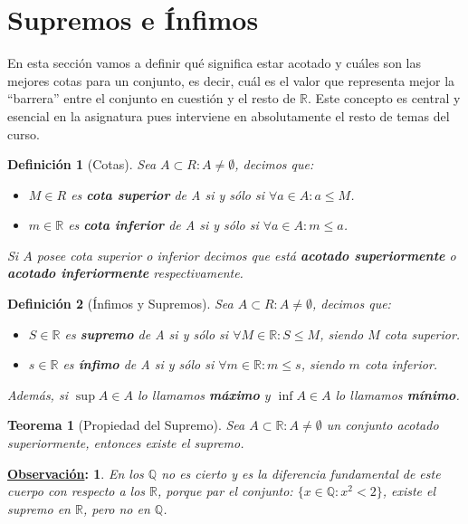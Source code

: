 \documentclass[10pt,a4paper,openright]{book}
\theoremstyle{break}
\newtheorem*{defi}{Definición}
\newtheorem*{theo}{Teorema}
\newtheorem*{obs}{\underline{Observación}:}
\begin{document}
\section{Supremos e Ínfimos}
En esta sección vamos a definir qué significa estar acotado y cuáles son las mejores cotas para un conjunto, es decir, cuál es el valor que representa mejor la ``barrera'' entre el conjunto en cuestión y el resto de $\mathbb{R}$. Este concepto es central y esencial en la asignatura pues interviene en absolutamente el resto de temas del curso.

\begin{defi}[Cotas]
Sea $A\subset R: A\neq \emptyset$, decimos que:
\begin{itemize}
\item $M\in R$ es \textbf{cota superior} de A si y sólo si $\forall a\in A: a\leq M$.

\item $m\in \mathbb R$ es \textbf{cota inferior} de A si y sólo si $\forall a\in A: m\leq a$.
\end{itemize}
Si $A$ posee cota superior o inferior decimos que está \textbf{acotado superiormente} o \textbf{acotado inferiormente} respectivamente.
\end{defi}

\begin{defi}[Ínfimos y Supremos]
Sea $A\subset R: A\neq \emptyset$, decimos que:
\begin{itemize}
\item $S\in \mathbb R$ es \textbf{supremo} de A si y sólo si $\forall M\in \mathbb R: S\leq M $, siendo $M$ cota superior.

\item $s\in \mathbb R$ es \textbf{ínfimo} de A si y sólo si $\forall m\in \mathbb R: m\leq s$, siendo $m$ cota inferior.
\end{itemize}
Además, si $\sup A \in A$ lo llamamos \textbf{máximo} y $\inf A \in A$ lo llamamos \textbf{mínimo}.
\end{defi}

\begin{theo}[Propiedad del Supremo]
Sea $A\subset \mathbb R: A\neq \emptyset$ un conjunto acotado superiormente, entonces existe el supremo.
\end{theo}

\begin{obs}
En los $\mathbb Q$ no es cierto y es la diferencia fundamental de este cuerpo con respecto a los $\mathbb R$, porque par el conjunto: $\{x\in \mathbb Q: x^2 < 2\}$, existe el supremo en $\mathbb R$, pero no en $\mathbb Q$.
\end{obs}
\end{document}
